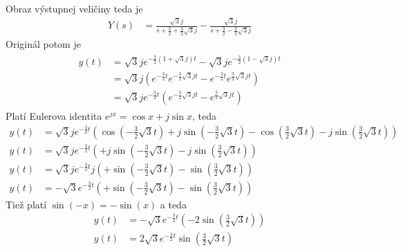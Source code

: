 \documentclass[a4paper, 10pt, ]{article}
\begin{document}
Obraz výstupnej veličiny teda je
\begin{align}
        Y(s) &= \frac{\sqrt{3} j}{s + \frac{3}{2} + \frac{3}{2} \sqrt{3} j} - \frac{\sqrt{3} j}{s + \frac{3}{2} - \frac{3}{2} \sqrt{3} j}
\end{align}
Originál potom je
\begin{align} %
    \begin{aligned}
        y(t) &= \sqrt{3} j e^{- \frac{3}{2} \left(1 + \sqrt{3}j\right) t} - \sqrt{3} j e^{- \frac{3}{2} \left(1 - \sqrt{3}j\right) t} \\
        &= \sqrt{3} j \left( 
            e^{-\frac{3}{2}t}   
            e^{-\frac{3}{2}\sqrt{3}jt}
            -
            e^{-\frac{3}{2}t}   
            e^{\frac{3}{2}\sqrt{3}jt}
            \right)
            \\
        &= \sqrt{3} j e^{-\frac{3}{2}t}    \left(   
            e^{-\frac{3}{2}\sqrt{3}jt}
            -
            e^{\frac{3}{2}\sqrt{3}jt}
        \right)  
    \end{aligned}
\end{align}
Platí Eulerova identita $e^{j x} = \cos x + j \sin x$, teda 
\begin{subequations}
\begin{align} %
        y(t) 
        &= \sqrt{3} j e^{-\frac{3}{2}t}    \left(   
            \cos \left( -\frac{3}{2}\sqrt{3}t \right) 
            + j \sin \left( -\frac{3}{2}\sqrt{3}t \right)
            -
            \cos \left( \frac{3}{2}\sqrt{3}t \right)
            - j \sin \left( \frac{3}{2}\sqrt{3}t \right)
        \right) \\  
        y(t) 
        &= \sqrt{3} j e^{-\frac{3}{2}t}    \left(   
            + j \sin \left( -\frac{3}{2}\sqrt{3}t \right)
            - j \sin \left( \frac{3}{2}\sqrt{3}t \right)
        \right)  \\
        y(t) 
        &= \sqrt{3} j e^{-\frac{3}{2}t}  j  \left(   
            + \sin \left( -\frac{3}{2}\sqrt{3}t \right)
            - \sin \left( \frac{3}{2}\sqrt{3}t \right)
        \right) \\
        y(t) 
        &= - \sqrt{3} e^{-\frac{3}{2}t}   \left(   
            + \sin \left( -\frac{3}{2}\sqrt{3}t \right)
            - \sin \left( \frac{3}{2}\sqrt{3}t \right)
        \right)
\end{align}
\end{subequations}
Tiež platí $ \sin(-x) = - \sin(x)$ a teda
\begin{subequations}
\begin{align}
    y(t) &= - \sqrt{3} e^{-\frac{3}{2}t}  
    \left(   
        - 2 \sin \left( \frac{3}{2}\sqrt{3}t \right)
    \right) \\
    y(t) &= 2 \sqrt{3} e^{-\frac{3}{2}t}  \sin \left( \frac{3}{2}\sqrt{3}t \right) \label{fun_ICH_SS2R_v3}
\end{align}
\end{subequations}
\end{document}
